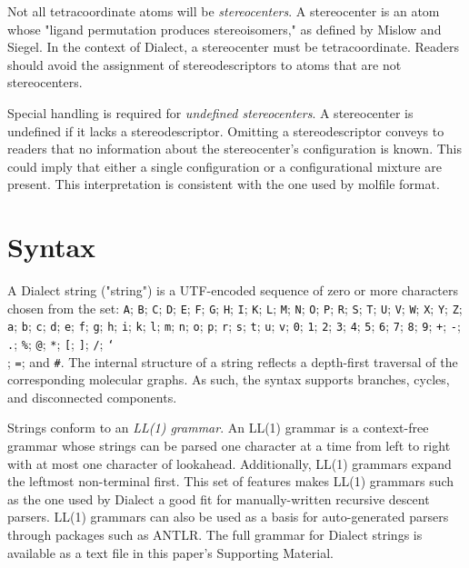 \documentclass{article}
\def\ttt{\texttt}
\begin{document}
Not all tetracoordinate atoms will be \textit{stereocenters}. A stereocenter is an atom whose "ligand permutation produces stereoisomers," as defined by Mislow and Siegel.\cite{mislow:1984} In the context of Dialect, a stereocenter must be tetracoordinate. Readers should avoid the assignment of stereodescriptors to atoms that are not stereocenters.

Special handling is required for \textit{undefined stereocenters}. A stereocenter is undefined if it lacks a stereodescriptor. Omitting a stereodescriptor conveys to readers that no information about the stereocenter's configuration is known. This could imply that either a single configuration or a configurational mixture are present. This interpretation is consistent with the one used by molfile format.\cite{ctfileFormats}

\section*{Syntax}

A Dialect string ("string") is a UTF-encoded sequence of zero or more characters chosen from the set: \ttt{A}; \ttt{B}; \ttt{C}; \ttt{D}; \ttt{E}; \ttt{F}; \ttt{G}; \ttt{H}; \ttt{I}; \ttt{K}; \ttt{L}; \ttt{M}; \ttt{N}; \ttt{O}; \ttt{P}; \ttt{R}; \ttt{S}; \ttt{T}; \ttt{U}; \ttt{V}; \ttt{W}; \ttt{X}; \ttt{Y}; \ttt{Z}; \ttt{a}; \ttt{b}; \ttt{c}; \ttt{d}; \ttt{e}; \ttt{f}; \ttt{g}; \ttt{h}; \ttt{i}; \ttt{k}; \ttt{l}; \ttt{m}; \ttt{n}; \ttt{o}; \ttt{p}; \ttt{r}; \ttt{s}; \ttt{t}; \ttt{u}; \ttt{v}; \ttt{0}; \ttt{1}; \ttt{2}; \ttt{3}; \ttt{4}; \ttt{5}; \ttt{6}; \ttt{7}; \ttt{8}; \ttt{9}; \ttt{+}; \ttt{-}; \ttt{.}; \ttt{\%}; \ttt{@}; \ttt{*}; \ttt{[}; \ttt{]}; \ttt{/}; \ttt{\char`\\}; \ttt{=}; and \ttt{\#}. The internal structure of a string reflects a depth-first traversal of the corresponding molecular graphs. As such, the syntax supports branches, cycles, and disconnected components.

Strings conform to an \textit{LL(1) grammar}. An LL(1) grammar is a context-free grammar whose strings can be parsed one character at a time from left to right with at most one character of lookahead. Additionally, LL(1) grammars expand the leftmost non-terminal first. This set of features makes LL(1) grammars such as the one used by Dialect a good fit for manually-written recursive descent parsers. LL(1) grammars can also be used as a basis for auto-generated parsers through packages such as ANTLR.\cite{parr:2014} The full grammar for Dialect strings is available as a text file in this paper's Supporting Material.
\end{document}
